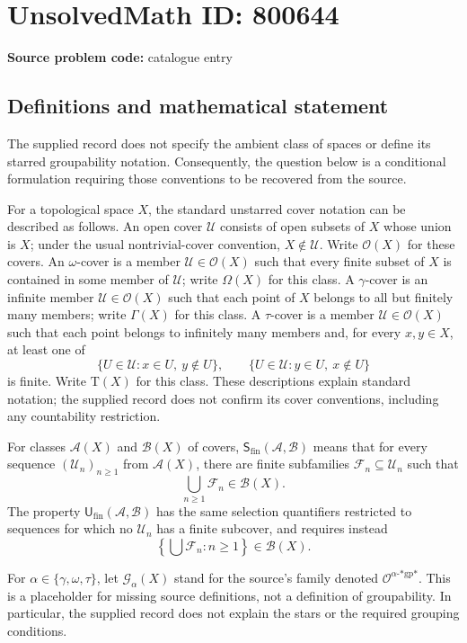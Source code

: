 \documentclass[11pt]{article}
\begin{document}
\section*{UnsolvedMath ID: 800644}
\textbf{Source problem code:} catalogue entry
\subsection{Definitions and mathematical statement}
The supplied record does not specify the ambient class of spaces or define its starred groupability notation. Consequently, the question below is a conditional formulation requiring those conventions to be recovered from the source.

For a topological space \(X\), the standard unstarred cover notation can be described as follows. An open cover \(\mathcal U\) consists of open subsets of \(X\) whose union is \(X\); under the usual nontrivial-cover convention, \(X\notin\mathcal U\). Write \(\mathcal O(X)\) for these covers. An \(\omega\)-cover is a member \(\mathcal U\in\mathcal O(X)\) such that every finite subset of \(X\) is contained in some member of \(\mathcal U\); write \(\Omega(X)\) for this class. A \(\gamma\)-cover is an infinite member \(\mathcal U\in\mathcal O(X)\) such that each point of \(X\) belongs to all but finitely many members; write \(\Gamma(X)\) for this class. A \(\tau\)-cover is a member \(\mathcal U\in\mathcal O(X)\) such that each point belongs to infinitely many members and, for every \(x,y\in X\), at least one of
\[
 \{U\in\mathcal U:x\in U,\ y\notin U\},\qquad
 \{U\in\mathcal U:y\in U,\ x\notin U\}
\]
is finite. Write \(\mathrm T(X)\) for this class. These descriptions explain standard notation; the supplied record does not confirm its cover conventions, including any countability restriction.

For classes \(\mathcal A(X)\) and \(\mathcal B(X)\) of covers, \(\mathsf S_{\mathrm{fin}}(\mathcal A,\mathcal B)\) means that for every sequence \((\mathcal U_n)_{n\geq1}\) from \(\mathcal A(X)\), there are finite subfamilies \(\mathcal F_n\subseteq\mathcal U_n\) such that
\[
 \bigcup_{n\geq1}\mathcal F_n\in\mathcal B(X).
\]
The property \(\mathsf U_{\mathrm{fin}}(\mathcal A,\mathcal B)\) has the same selection quantifiers restricted to sequences for which no \(\mathcal U_n\) has a finite subcover, and requires instead
\[
 \left\{\bigcup\mathcal F_n:n\geq1\right\}\in\mathcal B(X).
\]

For \(\alpha\in\{\gamma,\omega,\tau\}\), let \(\mathscr G_\alpha(X)\) stand for the source's family denoted \(\mathcal O^{\alpha\text{-*gp*}}\). This is a placeholder for missing source definitions, not a definition of groupability. In particular, the supplied record does not explain the stars or the required grouping conditions.
\end{document}
